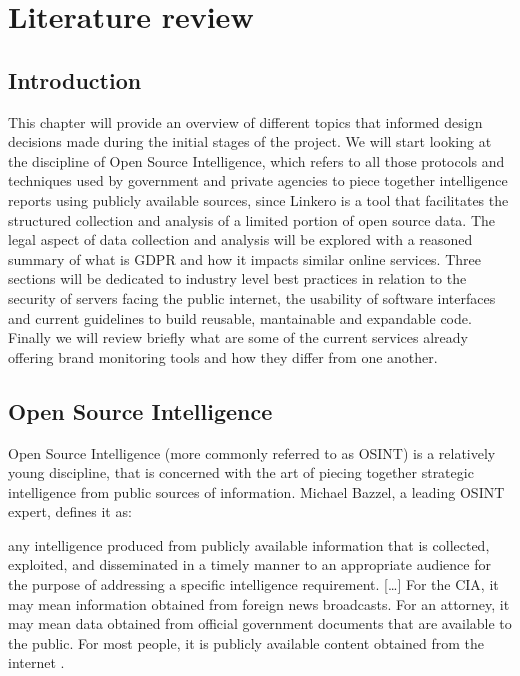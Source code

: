 \chapter{Literature review}

\section{Introduction}
This chapter will provide an overview of different topics that informed design
decisions made during the initial stages of the project. We will start looking
at the discipline of Open Source Intelligence, which refers to all those
protocols and techniques used by government and private agencies to piece
together intelligence reports using publicly available sources, since Linkero is
a tool that facilitates the structured collection and analysis of a limited
portion of open source data. The legal aspect of data collection and analysis
will be explored with a reasoned summary of what is GDPR and how it impacts
similar online services. Three sections will be dedicated to industry level best
practices in relation to the security of servers facing the public internet, the
usability of software interfaces and current guidelines to build reusable,
mantainable and expandable code. Finally we will review briefly what are some of
the current services already offering brand monitoring tools and how they differ
from one another.


\section{Open Source Intelligence}
Open Source Intelligence (more commonly referred to as OSINT) is a relatively
young discipline, that is concerned with the art of piecing together strategic
intelligence from public sources of information. Michael Bazzel, a leading OSINT expert,
defines it as:
\begin{displayquote}
any intelligence produced from publicly available information that is collected,
exploited, and disseminated in a timely manner to an appropriate audience for
the purpose of addressing a specific intelligence requirement. [\ldots] For the
CIA, it may mean information obtained from foreign news broadcasts. For an
attorney, it may mean data obtained from official government documents that are available to the
public. For most people, it is publicly available content obtained from the
internet \cite{MB15}.
\end{displayquote}

